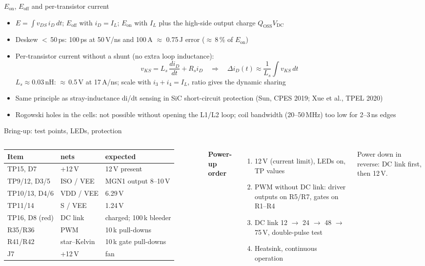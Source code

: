 \documentclass[aspectratio=169,10pt]{beamer}
\begin{document}
\begin{frame}{$E_\mathrm{on}$, $E_\mathrm{off}$ and per-transistor current}
\small
\begin{itemize}
\item $E = \int v_{DS}\, i_D\, dt$; $E_\mathrm{off}$ with $i_D = I_L$; $E_\mathrm{on}$ with $I_L$ plus the high-side output charge $Q_\mathrm{OSS}V_\mathrm{DC}$
\item Deskew $<$\,50\,ps: 100\,ps at 50\,V/ns and 100\,A $\approx$ 0.75\,\textmu J error ($\approx$\,8\,\% of $E_\mathrm{on}$)
\item Per-transistor current without a shunt (no extra loop inductance):
\[ v_{KS} = L_s\,\frac{di_D}{dt} + R_s i_D \quad\Rightarrow\quad \Delta i_D(t) \approx \frac{1}{L_s}\int v_{KS}\,dt \]
$L_s \approx 0.03$\,nH: $\approx$\,0.5\,V at 17\,A/ns; scale with $i_3+i_4 = I_L$, ratio gives the dynamic sharing
\item Same principle as stray-inductance di/dt sensing in SiC short-circuit protection (Sun, CPES 2019; Xue et al., TPEL 2020)
\item Rogowski holes in the cells: not possible without opening the L1/L2 loop; coil bandwidth (20--50\,MHz) too low for 2--3\,ns edges
\end{itemize}
\end{frame}
\begin{frame}{Bring-up: test points, LEDs, protection}
\begin{columns}[T]
\scriptsize
\begin{tabular}{@{}lll@{}}
\toprule
Item & nets & expected \\
\midrule
TP15, D7 & +12\,V & 12\,V present \\
TP9/12, D3/5 & ISO / VEE & MGN1 output 8--10\,V \\
TP10/13, D4/6 & VDD / VEE & 6.29\,V \\
TP11/14 & S / VEE & 1.24\,V \\
TP16, D8 (red) & DC link & charged; 100\,k bleeder \\
R35/R36 & PWM & 10\,k pull-downs \\
R41/R42 & star--Kelvin & 10\,k gate pull-downs \\
J7 & +12\,V & fan \\
\bottomrule
\end{tabular}
\small
\textbf{Power-up order}
\begin{enumerate}\footnotesize
\item 12\,V (current limit), LEDs on, TP values
\item PWM without DC link: driver outputs on R5/R7, gates on R1--R4
\item DC link 12 $\rightarrow$ 24 $\rightarrow$ 48 $\rightarrow$ 75\,V, double-pulse test
\item Heatsink, continuous operation
\end{enumerate}
\footnotesize Power down in reverse: DC link first, then 12\,V.
\end{columns}
\end{frame}
\end{document}
